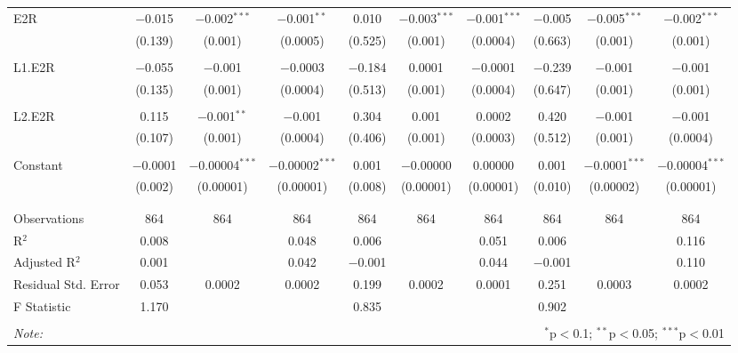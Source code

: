 \documentclass[a4paper]{article}
\begin{document}
\begin{table}[!htbp]
{\begin{tabular}{@{\extracolsep{5pt}}lccccccccc}
 E2R & $-$0.015 & $-$0.002$^{***}$ & $-$0.001$^{**}$ & 0.010 & $-$0.003$^{***}$ & $-$0.001$^{***}$ & $-$0.005 & $-$0.005$^{***}$ & $-$0.002$^{***}$ \\ 
  & (0.139) & (0.001) & (0.0005) & (0.525) & (0.001) & (0.0004) & (0.663) & (0.001) & (0.001) \\ 
  & & & & & & & & & \\ 
 L1.E2R & $-$0.055 & $-$0.001 & $-$0.0003 & $-$0.184 & 0.0001 & $-$0.0001 & $-$0.239 & $-$0.001 & $-$0.001 \\ 
  & (0.135) & (0.001) & (0.0004) & (0.513) & (0.001) & (0.0004) & (0.647) & (0.001) & (0.001) \\ 
  & & & & & & & & & \\ 
 L2.E2R & 0.115 & $-$0.001$^{**}$ & $-$0.001 & 0.304 & 0.001 & 0.0002 & 0.420 & $-$0.001 & $-$0.001 \\ 
  & (0.107) & (0.001) & (0.0004) & (0.406) & (0.001) & (0.0003) & (0.512) & (0.001) & (0.0004) \\ 
  & & & & & & & & & \\ 
 Constant & $-$0.0001 & $-$0.00004$^{***}$ & $-$0.00002$^{***}$ & 0.001 & $-$0.00000 & 0.00000 & 0.001 & $-$0.0001$^{***}$ & $-$0.00004$^{***}$ \\ 
  & (0.002) & (0.00001) & (0.00001) & (0.008) & (0.00001) & (0.00001) & (0.010) & (0.00002) & (0.00001) \\ 
  & & & & & & & & & \\ 
\hline \\[-1.8ex] 
Observations & 864 & 864 & 864 & 864 & 864 & 864 & 864 & 864 & 864 \\ 
R$^{2}$ & 0.008 &  & 0.048 & 0.006 &  & 0.051 & 0.006 &  & 0.116 \\ 
Adjusted R$^{2}$ & 0.001 &  & 0.042 & $-$0.001 &  & 0.044 & $-$0.001 &  & 0.110 \\ 
Residual Std. Error & 0.053 & 0.0002 & 0.0002 & 0.199 & 0.0002 & 0.0001 & 0.251 & 0.0003 & 0.0002 \\ 
F Statistic & 1.170 &  &  & 0.835 &  &  & 0.902 &  &  \\ 
\hline 
\hline \\[-1.8ex] 
\textit{Note:}  & \multicolumn{9}{r}{$^{*}$p$<$0.1; $^{**}$p$<$0.05; $^{***}$p$<$0.01} \\ 
\end{tabular} 
}
\end{table} 
\FloatBarrier
\end{document}
